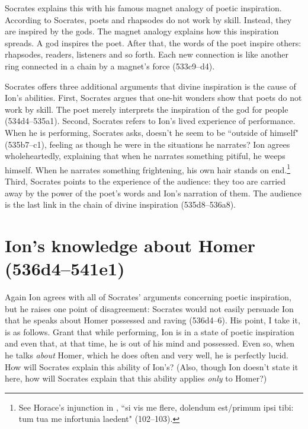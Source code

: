 \documentclass[11pt]{article}
\begin{document}
Socrates explains this with his famous magnet analogy of poetic
inspiration.  According to Socrates, poets and rhapsodes do not work by
skill.  Instead, they are inspired by the gods.  The magnet analogy
explains how this inspiration spreads.  A god inspires the poet.  After
that, the words of the poet inspire others: rhapsodes, readers, listeners
and so forth.  Each new connection is like another ring connected in
a chain by a magnet's force (533c9--d4).

Socrates offers three additional arguments that divine inspiration is the
cause of Ion's abilities.  First, Socrates argues that one-hit wonders show
that poets do not work by skill.  The poet merely interprets the
inspiration of the god for people (534d4--535a1).  Second, Socrates refers
to Ion's lived experience of performance.  When he is performing, Socrates
asks, doesn't he seem to be ``outside of himself" (535b7--c1), feeling as
though he were in the situations he narrates?  Ion agrees wholeheartedly,
explaining that when he narrates something pitiful, he weeps himself. When
he narrates something frightening, his own hair stands on end.\footnote{See
Horace's injunction in , ``si vis me flere, dolendum
est/primum ipsi tibi: tum tua me infortunia laedent" (102--103).}  Third,
Socrates points to the experience of the audience: they too are carried
away by the power of the poet's words and Ion's narration of them.  The
audience is the last link in the chain of divine inspiration
(535d8--536a8).


\section{Ion's knowledge about Homer (536d4--541e1)}

Again Ion agrees with all of Socrates' arguments concerning poetic
inspiration, but he raises one point of disagreement: Socrates would not
easily persuade Ion that he speaks about Homer possessed and raving
(536d4--6).  His point, I take it, is as follows. Grant that while
performing, Ion is in a state of poetic inspiration and even that, at that
time, he is out of his mind and possessed.  Even so, when he talks
\emph{about} Homer, which he does often and very well, he is perfectly
lucid.  How will Socrates explain this ability of Ion's?  (Also, though Ion
doesn't state it here, how will Socrates explain that this ability applies
\emph{only} to Homer?)
\end{document}
